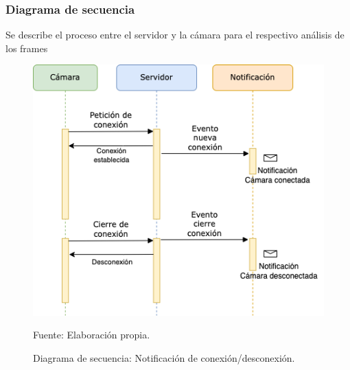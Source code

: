 \subsubsection{Diagrama de secuencia}
Se describe el proceso entre el servidor y la cámara para el respectivo análisis de los frames

\begin{figure}[H]
    \begin{center}
        \includegraphics[width=12cm]{img/capitulo_4/camera_notif.png}
    \end{center}
    \begin{center}
        \caption{Diagrama de secuencia: Notificación de conexión/desconexión.}
        Fuente: Elaboración propia.
        \label{fig:diag_sec_notif_conn}
    \end{center}
\end{figure}

